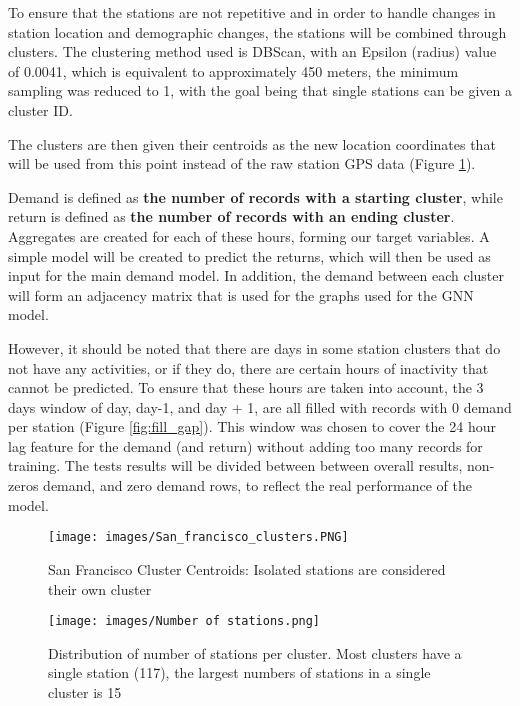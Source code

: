 \documentclass{article}
\begin{document}
To ensure that the stations are not repetitive and in order to handle changes in station location and demographic changes, the stations will be combined through clusters. The clustering method used is DBScan, with an Epsilon (radius) value of 0.0041, which is equivalent to approximately 450 meters, the minimum sampling was reduced to 1, with the goal being that single stations can be given a cluster ID.

The clusters are then given their centroids as the new location coordinates that will be used from this point instead of the raw station GPS data (Figure \ref{fig:station_clusters}).

Demand is defined as \textbf{the number of records with a starting cluster}, while return is defined as \textbf{the number of records with an ending cluster}. Aggregates are created for each of these hours, forming our target variables. A simple model will be created to predict the returns, which will then be used as input for the main demand model. In addition, the demand between each cluster will form an adjacency matrix that is used for the graphs used for the GNN model.

However, it should be noted that there are days in some station clusters that do not have any activities, or if they do, there are certain hours of inactivity that cannot be predicted. To ensure that these hours are taken into account, the 3 days window of day, day-1, and day + 1, are all filled with records with 0 demand per station (Figure \ref{fig:fill_gap}). This window was chosen to cover the 24 hour lag feature for the demand (and return) without adding too many records for training. The tests results will be divided between between overall results, non-zeros demand, and zero demand rows, to reflect the real performance of the model.


\begin{figure}
\centering
\texttt{[image: images/San\_francisco\_clusters.PNG]}
\caption{San Francisco Cluster Centroids: Isolated stations are considered their own cluster}
\label{fig:station_clusters}
\end{figure}


\begin{figure}
\texttt{[image: images/Number of stations.png]}
\caption{Distribution of number of stations per cluster. Most clusters have a single station (117), the largest numbers of stations in a single cluster is 15}
\label{fig:number_of_stations}
\end{figure}
\end{document}
